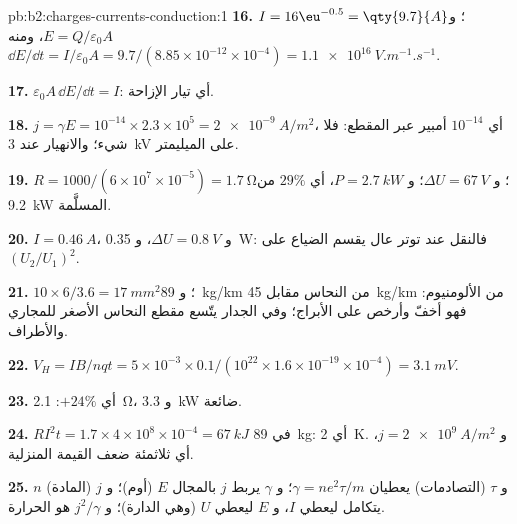 \begin{solution}{pb:b2:charges-currents-conduction:1}
\textbf{16.} $I = 16\eu^{-0.5} = \qty{9.7}{A}$؛ و $E = Q/\varepsilon_0A$، ومنه $\dd E/\dd t = I/\varepsilon_0A
= 9.7/(8.85 \times 10^{-12} \times 10^{-4}) = \qty{1.1e16}{V.m^{-1}.s^{-1}}$.

\textbf{17.} $\varepsilon_0A\,\dd E/\dd t = I$: أي تيار الإزاحة.

\textbf{18.} $j = \gamma E = 10^{-14} \times 2.3 \times 10^5 = \qty{2e-9}{A/m^2}$، أي $10^{-14}$ أمبير
عبر المقطع: فلا شيء؛ والانهيار عند \qty{3}{kV} على الميليمتر.

\textbf{19.} $R = 1000/(6 \times 10^7 \times 10^{-5}) = \qty{1.7}{\ohm}$؛ و $\Delta U = \qty{67}{V}$؛ و $P =
\qty{2.7}{kW}$، أي $29\%$ من \qty{9.2}{kW} المسلَّمة.

\textbf{20.} $I = \qty{0.46}{A}$، و $\Delta U = \qty{0.8}{V}$، و \qty{0.35}{W}: فالنقل عند
توتر عال يقسم الضياع على $(U_2/U_1)^2$.

\textbf{21.} $10 \times 6/3.6 = \qty{17}{mm^2}$؛ و \qty{89}{kg/km} من النحاس مقابل
\qty{45}{kg/km} من الألومنيوم: فهو أخفّ وأرخص على الأبراج؛ وفي الجدار
يتّسع مقطع النحاس الأصغر للمجاري والأطراف.

\textbf{22.} $V_H = IB/nqt = 5 \times 10^{-3} \times 0.1/(10^{22} \times 1.6 \times 10^{-19} \times 10^{-4}) =
\qty{3.1}{mV}$.

\textbf{23.} أي $+24\%$: \qty{2.1}{\ohm}، و \qty{3.3}{kW} ضائعة.

\textbf{24.} $RI^2t = 1.7 \times 4 \times 10^8 \times 10^{-4} = \qty{67}{kJ}$ في \qty{89}{kg}: أي \qty{2}{K}.
و $j = \qty{2e9}{A/m^2}$، أي ثلاثمئة ضعف القيمة المنزلية.

\textbf{25.} $n$ (المادة) و $\tau$ (التصادمات) يعطيان $\gamma = ne^2\tau/m$؛
و $\gamma$ يربط $j$ بالمجال $E$ (أوم)؛ و $j$ يتكامل ليعطي $I$، و $E$ ليعطي $U$ (وهي
الدارة)؛ و $j^2/\gamma$ هو الحرارة.
\end{solution}
